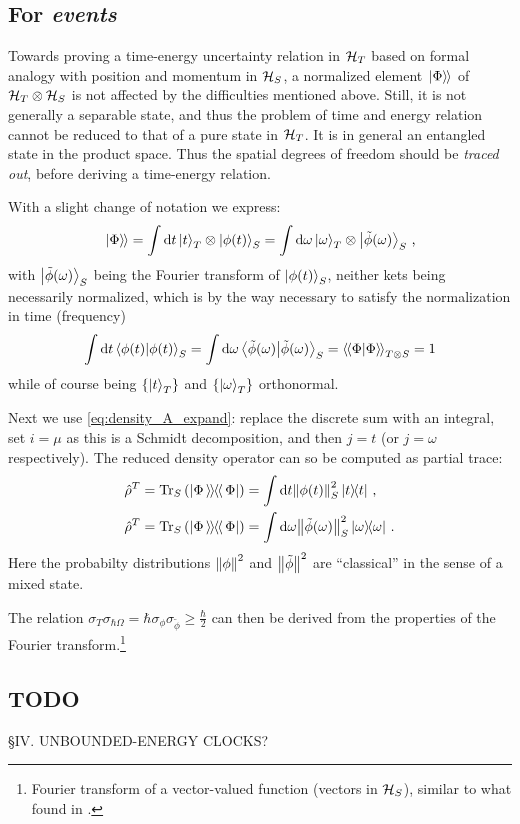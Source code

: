 \subsection{For \emph{events}}

Towards proving a time-energy uncertainty relation in $\mathcal{H}_T$
based on formal analogy with position and momentum in $\mathcal{H}_S$,
a normalized element $\left.\left| \Phi \right\rangle\hspace{-0.115em}\right\rangle$ of $\mathcal{H}_T\otimes\mathcal{H}_S$ 
is not affected by the difficulties mentioned above.
Still, it is not generally
a separable state,
and thus
the problem of time and energy relation cannot be reduced to that of
a pure state in $\mathcal{H}_T$.
It is in general an entangled state in the product space.
Thus the spatial degrees of freedom should be \emph{traced out},
before deriving a time-energy relation.

With a slight change of notation we express:
\begin{equation}
  \left.\left| \Phi \right\rangle\hspace{-0.115em}\right\rangle =
    \int \dd{t} \ket{t}_T \otimes \ket{\phi(t)}_S =
    \int \dd\omega \ket{\omega}_T \otimes \ket{\tilde{\phi}(\omega)}_S \, \text{,}
\end{equation}
with $\ket{\tilde{\phi}(\omega)}_S$ being the Fourier transform
of $\ket{\phi(t)}_S$,
neither kets being necessarily normalized, which is by the way necessary
to satisfy the normalization in time (frequency)
\[
  \int \dd{t} \braket{\phi(t)}_S =
    \int \dd{\omega} \braket{\tilde{\phi}(\omega)}_S =
    \left\langle\hspace{-0.115em}\left\langle \Phi \middle| \Phi \right\rangle\hspace{-0.115em}\right\rangle_{T \otimes S} = 
    1
\]
while of course being $\left\{\ket{t}_T\right\}$ and $\left\{\ket{\omega}_T\right\}$
orthonormal.

Next we use \eqref{eq:density_A_expand}: replace the discrete sum with an integral,
set $i = \mu$ as this is a Schmidt decomposition, and then $j = t$
(or $j = \omega$ respectively).
The reduced density operator can so be computed
as partial trace:
\begin{align}
  \hat{\rho}^T = \Tr_S\qty(\left| \Phi \left\rangle\hspace{-0.115em}\left\rangle \hspace{-0.115em} \right\langle\hspace{-0.115em}\right\langle \Phi \right|) &= \int \dd t \norm{\phi(t)}^2_S \ketbra{t}{t}
    \, \text{,}
  \\ 
  \hat{\rho}^T = \Tr_S\qty(\left| \Phi \left\rangle\hspace{-0.115em}\left\rangle \hspace{-0.115em} \right\langle\hspace{-0.115em}\right\langle \Phi \right|) &= \int \dd \omega \norm{\tilde{\phi}(\omega)}^2_S \ketbra{\omega}{\omega}
    \,\text{.} 
\end{align}
Here the probabilty distributions $\norm{\phi}^2$ and $\norm{\tilde{\phi}}^2$
are ``classical'' in the sense of a mixed state.

The relation $\sigma_T\sigma_{\hbar\Omega} = \hbar \sigma_{\phi} \sigma_{\tilde{\phi}} \geq \frac{\hbar}{2}$
can then be derived from the properties of the Fourier transform.\footnote{
  Fourier transform of a
  vector-valued function
  (vectors in $\mathcal{H}_S$),
  similar to what found in \cite{Maccone:Pauli}.
}

\subsection{TODO}
\cite{Maccone:Pauli} \S IV.  UNBOUNDED-ENERGY CLOCKS?
\fi